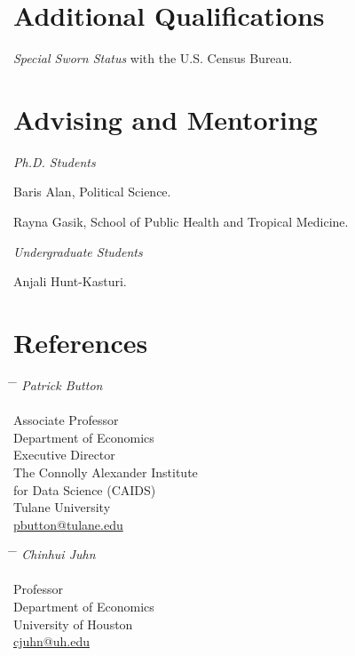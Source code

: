 \documentclass[letterpaper]{article}
\renewenvironment{itemize}{
  \begin{list}{}{
    \setlength{\leftmargin}{1.5em}
  }
}{
  \end{list}
}
\begin{document}
\section*{Additional Qualifications}
\vspace{2 mm}
{\makebox[2.3cm]{\hfill}}\textit{Special Sworn Status} with the U.S. Census Bureau.
\vspace{2 mm}

\section*{Advising and Mentoring}

\textit{Ph.D. Students}
\vspace{2 mm}
\begin{itemize}
  \item {} Baris Alan, Political Science.
  \item {} Rayna Gasik, School of Public Health and Tropical Medicine.
\end{itemize}
\vspace{2 mm}
\textit{Undergraduate Students}
\vspace{2 mm}
\begin{itemize}
\item {} Anjali Hunt-Kasturi.
\end{itemize}


\newpage
\section*{References}


\parbox[t]{0.32\textwidth}{

\begin{tabbing}
\hspace{2.75cm} \= \hspace{4cm} \= \kill
{\textit{Patrick Button }}  \\\\
Associate Professor \\
Department of Economics \\
Executive Director \\
The Connolly Alexander Institute \\
for Data Science (CAIDS) \\
{Tulane University}\\
{\href{mailto:pbutton@tulane.edu}{pbutton@tulane.edu}}
\end{tabbing}}
\hfill
\parbox[t]{0.32\textwidth}{
\begin{tabbing}
\hspace{2.75cm} \= \hspace{4cm} \= \kill
{\textit{Chinhui Juhn }} \\\\
Professor \\
Department of Economics \\
{University of Houston}\\
{\href{mailto:cjuhn@uh.edu}{cjuhn@uh.edu}}
\end{tabbing}}
\end{document}
